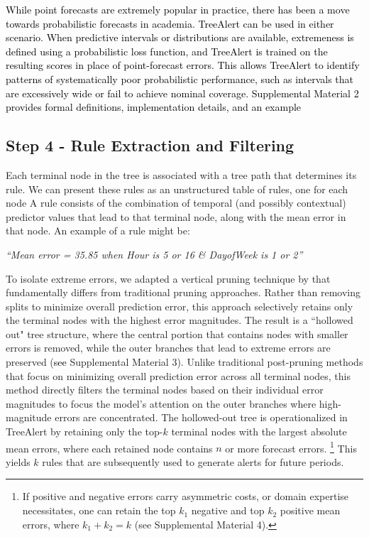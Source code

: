 \documentclass[12pt]{article}
\newcommand{\galit}[1]{\textcolor{black}{#1}}
\newcommand{\matt}[1]{\textcolor{black}{#1}}
\begin{document}
\matt{While point forecasts are extremely popular in practice, there has been a move towards probabilistic forecasts in academia. TreeAlert can be used in either scenario. When predictive intervals or distributions are available, extremeness is defined using a probabilistic loss function, and TreeAlert is trained on the resulting scores in place of point-forecast errors. This allows TreeAlert to identify patterns of systematically poor probabilistic performance, such as intervals that are excessively wide or fail to achieve nominal coverage. Supplemental Material 2 provides formal definitions, implementation details, and an %
example} %

\subsection{Step 4 - Rule Extraction and Filtering}
\label{sec:rule-extraction}
Each terminal node in the tree is associated with a tree path that determines its rule. We can present these rules as an unstructured table of rules, one for each node %
A rule consists of the combination of temporal (and possibly contextual) predictor values that lead to that terminal node, along with the mean error in that node. An example of a rule might be: 
\begin{center}
\textit{``Mean error = 35.85 when Hour is 5 or 16 \& DayofWeek is 1 or 2''}
\end{center}

To isolate extreme errors, we adapted a vertical pruning technique by \cite{danks2024composite} that fundamentally differs from traditional pruning approaches. Rather than removing splits to minimize overall prediction error, this approach selectively retains only the terminal nodes with the highest error magnitudes. The result is a ``hollowed out" tree structure, where the central portion that contains nodes with smaller errors is removed, while the outer branches that lead to extreme errors are preserved (\galit{see} %
Supplemental Material 3). Unlike traditional post-pruning methods that focus on minimizing overall prediction error across all terminal nodes, this method directly filters the terminal nodes based on their individual error magnitudes to focus the model’s attention on the outer branches where high-magnitude errors are concentrated.
The hollowed-out tree is operationalized in TreeAlert by retaining only the top-$k$ %
terminal nodes with the largest absolute mean errors, where each retained node contains $n$ or more forecast errors.%
\footnote{If positive and negative errors carry asymmetric costs, or domain expertise necessitates, one can retain the top $k_1$ negative and top $k_2$ positive mean errors, where $k_1 + k_2 = k$ (see Supplemental Material 4).} This yields $k$ rules that are subsequently used to generate alerts for future periods.
\end{document}
